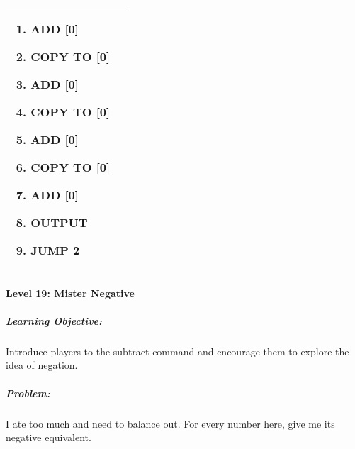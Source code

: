 \begin{center}
\begin{tabular}{ | m{6cm} | m{8cm} | }
\begin{enumerate}
		\item ADD [0]
		\item COPY TO [0]
		\item ADD [0]
		\item COPY TO [0]
		\item ADD [0]
		\item COPY TO [0]
		\item ADD [0]
		\item OUTPUT
		\item JUMP 2
            \end{enumerate}
            \\
        \hline
    \end{tabular}
\end{center}


\paragraph{Level 19: Mister Negative}
\subparagraph{Learning Objective:} Introduce players to the subtract command and encourage them to explore the idea of negation.

\subparagraph{Problem:} I ate too much and need to balance out. For every number here, give me its negative equivalent.

